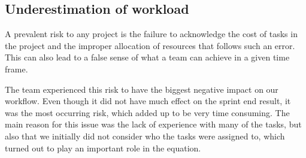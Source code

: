 \begin{comment}
\section{The most influential risks}
As explained in section~\ref{sec:risk}, the team analyzed the possible risks that might occur during the time scope of the project. The risk analysis in table~\ref{tab:risktable} gives a certain idea on how much of an impact the team expected a risk to have, but says nothing about which risks that actually occurred and that had a big impact on the project. This section gives a short description of the most influential risks the team experienced throughout the project.
\end{comment}

\subsection{Underestimation of workload}
A prevalent risk to any project is the failure to acknowledge the cost of tasks in the project and the improper allocation of resources that follows such an error. This can also lead to a false sense of what a team can achieve in a given time frame. 

The team experienced this risk to have the biggest negative impact on our workflow. Even though it did not have much effect on the sprint end result, it was the most occurring risk, which added up to be very time consuming. The main reason for this issue was the lack of experience with many of the tasks, but also that we initially did not consider who the tasks were assigned to, which turned out to play an important role in the equation. 

\begin{comment}
\subsection{Issues with software or tools}
Any team of software developers usually rely on a set of tools and software to help them develop and document a system. Unavailability, lack of experience or improper use of such tools can lead to setbacks in progress.

The team experienced this both with the Scrum tool, as described in section~\ref{sec:improperScrum}, and when setting up the Android development environment.

\subsection{Unbalanced workload}
Failure to estimate the cost of tasks, or failure to allocate them wisely, can leave some team members grasping for more work while others are bogged down with either too heavy tasks or a much greater workload.

The team did experience this, but considered it to be more of an opportunity to improve the use of resources and streamline the workflow rather than being a high impact issue. Further details about this issue may be found in section~\ref{sec:unbalancedWorkload}.
\end{comment}
